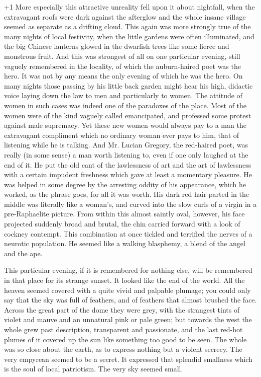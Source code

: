 \looseness+1
More especially this attractive unreality fell upon it about nightfall, when the extravagant roofs were dark against the afterglow and the whole insane village seemed as separate as a drifting cloud. This again was more strongly true of the many nights of local festivity, when the little gardens were often illuminated, and the big Chinese lanterns glowed in the dwarfish trees like some fierce and monstrous fruit. And this was strongest of all on one particular evening, still vaguely remembered in the locality, of which the auburn-haired poet was the hero. It was not by any means the only evening of which he was the hero. On many nights those passing by his little back garden might hear his high, didactic voice laying down the law to men and particularly to women. The attitude of women in such cases was indeed one of the paradoxes of the place. Most of the women were of the kind vaguely called emancipated, and professed some protest against male supremacy. Yet these new women would always pay to a man the extravagant compliment which no ordinary woman ever pays to him, that of listening while he is talking. And Mr. Lucian Gregory, the red-haired poet, was really (in some sense) a man worth listening to, even if one only laughed at the end of it. He put the old cant of the lawlessness of art and the art of lawlessness with a certain impudent freshness which gave at least a momentary pleasure. He was helped in some degree by the arresting oddity of his appearance, which he worked, as the phrase goes, for all it was worth. His dark red hair parted in the middle was literally like a woman’s, and curved into the slow curls of a virgin in a pre-Raphaelite picture. From within this almost saintly oval, however, his face projected suddenly broad and brutal, the chin carried forward with a look of cockney contempt. This combination at once tickled and terrified the nerves of a neurotic population. He seemed like a walking blasphemy, a blend of the angel and the ape.

This particular evening, if it is remembered for nothing else, will be remembered in that place for its strange sunset. It looked like the end of the world. All the heaven seemed covered with a quite vivid and palpable plumage; you could only say that the sky was full of feathers, and of feathers that almost brushed the face. Across the great part of the dome they were grey, with the strangest tints of violet and mauve and an unnatural pink or pale green; but towards the west the whole grew past description, transparent and passionate, and the last red-hot plumes of it covered up the sun like something too good to be seen. The whole was so close about the earth, as to express nothing but a violent secrecy. The very empyrean seemed to be a secret. It expressed that splendid smallness which is the soul of local patriotism. The very sky seemed small.

